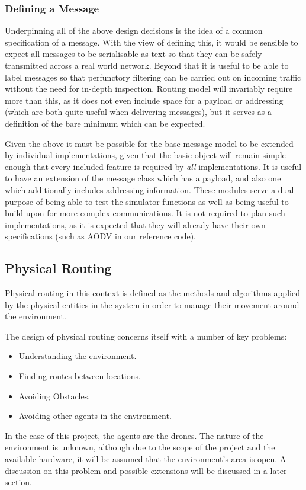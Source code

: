 \subsubsection{Defining a Message}
Underpinning all of the above design decisions is the idea of a common specification of a message. With the view of defining this, it would be sensible to expect all messages to be serialisable as text so that they can be safely transmitted across a real world network. Beyond that it is useful to be able to label messages so that perfunctory filtering can be carried out on incoming traffic without the need for in-depth inspection. Routing model will invariably require more than this, as it does not even include space for a payload or addressing (which are both quite useful when delivering messages), but it serves as a definition of the bare minimum which can be expected. 

Given the above it must be possible for the base message model to be extended by individual implementations, given that the basic object will remain simple enough that every included feature is required by \textit{all} implementations. It is useful to have an extension of the message class which has a payload, and also one which additionally includes addressing information. These modules serve a dual purpose of being able to test the simulator functions as well as being useful to build upon for more complex communications. It is not required to plan such implementations, as it is expected that they will already have their own specifications (such as AODV in our reference code).
		
\subsection{Physical Routing} 
Physical routing in this context is defined as the methods and algorithms applied by the physical entities in the system in order to manage their movement around the environment.

The design of physical routing concerns itself with a number of key problems:
\begin{itemize}
\item Understanding the environment.
\item Finding routes between locations.
\item Avoiding Obstacles.
\item Avoiding other agents in the environment.
\end{itemize}

In the case of this project, the agents are the drones. The nature of the environment is unknown, although due to the scope of the project and the available hardware, it will be assumed that the environment's area is open. A discussion on this problem and possible extensions will be discussed in a later section.

